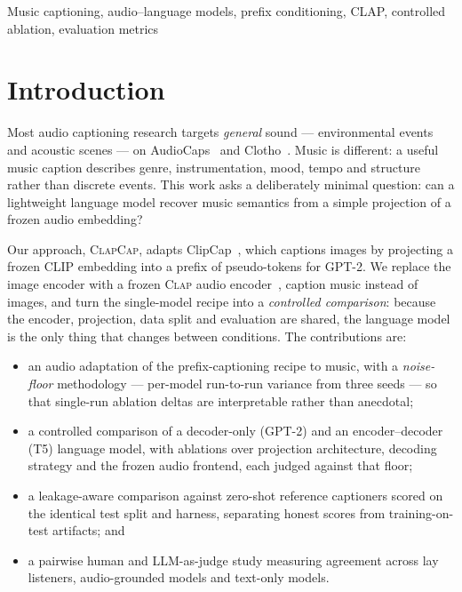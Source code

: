 \documentclass[conference]{IEEEtran}
\newcommand{\clapenc}{\textsc{Clap}}
\newcommand{\sys}{\textsc{ClapCap}}
\begin{document}
\begin{IEEEkeywords}
Music captioning, audio--language models, prefix conditioning, CLAP, controlled ablation,
evaluation metrics
\end{IEEEkeywords}

\section{Introduction}

Most audio captioning research targets \emph{general} sound --- environmental events and
acoustic scenes --- on AudioCaps~\cite{kim2019audiocaps} and Clotho~\cite{drossos2020clotho}.
Music is different: a useful music caption describes genre, instrumentation, mood, tempo and
structure rather than discrete events. This work asks a deliberately minimal question: can a
lightweight language model recover music semantics from a simple projection of a frozen audio
embedding?

Our approach, \sys{}, adapts ClipCap~\cite{mokady2021clipcap}, which captions images by
projecting a frozen CLIP embedding into a prefix of pseudo-tokens for GPT-2. We replace the
image encoder with a frozen \clapenc{} audio encoder~\cite{wu2023clap}, caption music instead of
images, and turn the single-model recipe into a \emph{controlled comparison}: because the
encoder, projection, data split and evaluation are shared, the language model is the only thing
that changes between conditions. The contributions are:

\begin{itemize}\itemsep2pt
  \item an audio adaptation of the prefix-captioning recipe to music, with a
        \emph{noise-floor} methodology --- per-model run-to-run variance from three seeds ---
        so that single-run ablation deltas are interpretable rather than anecdotal;
  \item a controlled comparison of a decoder-only (GPT-2) and an encoder--decoder (T5) language
        model, with ablations over projection architecture, decoding strategy and the frozen
        audio frontend, each judged against that floor;
  \item a leakage-aware comparison against zero-shot reference captioners scored on the
        identical test split and harness, separating honest scores from training-on-test
        artifacts; and
  \item a pairwise human and LLM-as-judge study measuring agreement across lay listeners,
        audio-grounded models and text-only models.
\end{itemize}
\end{document}
